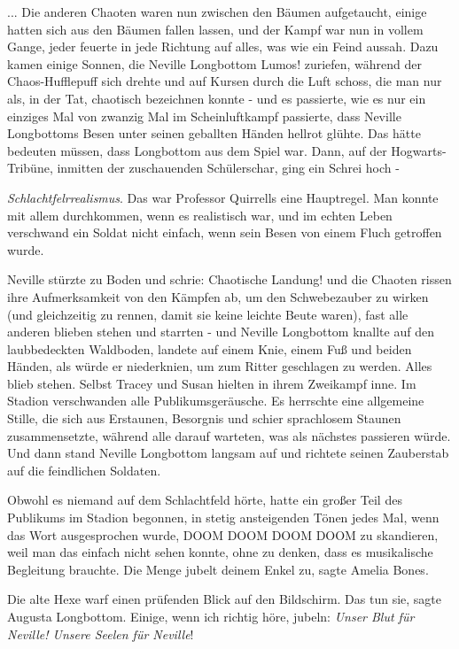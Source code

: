 ... Die anderen Chaoten waren nun zwischen den Bäumen aufgetaucht, einige hatten
sich aus den Bäumen fallen lassen, und der Kampf war nun in vollem Gange, jeder
feuerte in jede Richtung auf alles, was wie ein Feind aussah. Dazu kamen einige
Sonnen, die Neville Longbottom \glqq{}Lumos!\grqq{} zuriefen, während der
Chaos-Hufflepuff sich drehte und auf Kursen durch die Luft schoss, die man nur
als, in der Tat, \glqq{}chaotisch\grqq{} bezeichnen konnte - und es passierte,
wie es nur ein einziges Mal von zwanzig Mal im Scheinluftkampf passierte, dass
Neville Longbottoms Besen unter seinen geballten Händen hellrot glühte. Das
hätte bedeuten müssen, dass Longbottom aus dem Spiel war. Dann, auf der
Hogwarts-Tribüne, inmitten der zuschauenden Schülerschar, ging ein Schrei hoch -

\emph{Schlachtfelrrealismus}. Das war Professor Quirrells eine Hauptregel. Man
konnte mit allem durchkommen, wenn es realistisch war, und im echten Leben
verschwand ein Soldat nicht einfach, wenn sein Besen von einem Fluch getroffen
wurde.

Neville stürzte zu Boden und schrie: \glqq{}Chaotische Landung!\grqq{} und die
Chaoten rissen ihre Aufmerksamkeit von den Kämpfen ab, um den Schwebezauber zu
wirken (und gleichzeitig zu rennen, damit sie keine leichte Beute waren), fast
alle anderen blieben stehen und starrten - und Neville Longbottom knallte auf
den laubbedeckten Waldboden, landete auf einem Knie, einem Fuß und beiden
Händen, als würde er niederknien, um zum Ritter geschlagen zu werden. Alles
blieb stehen. Selbst Tracey und Susan hielten in ihrem Zweikampf inne. Im
Stadion verschwanden alle Publikumsgeräusche. Es herrschte eine allgemeine
Stille, die sich aus Erstaunen, Besorgnis und schier sprachlosem Staunen
zusammensetzte, während alle darauf warteten, was als nächstes passieren würde.
Und dann stand Neville Longbottom langsam auf und richtete seinen Zauberstab auf
die feindlichen Soldaten.

Obwohl es niemand auf dem Schlachtfeld hörte, hatte ein großer Teil des
Publikums im Stadion begonnen, in stetig ansteigenden Tönen jedes Mal, wenn das
Wort ausgesprochen wurde, \glqq{}DOOM DOOM DOOM DOOM\grqq{} zu skandieren, weil
man das einfach nicht sehen konnte, ohne zu denken, dass es musikalische
Begleitung brauchte. \glqq{}Die Menge jubelt deinem Enkel zu\grqq{}, sagte Amelia
Bones.

Die alte Hexe warf einen prüfenden Blick auf den Bildschirm. \glqq{}Das tun
sie\grqq{}, sagte Augusta Longbottom. \glqq{}Einige, wenn ich richtig höre,
jubeln: \emph{Unser Blut für Neville! Unsere Seelen für Neville}!\grqq{}

